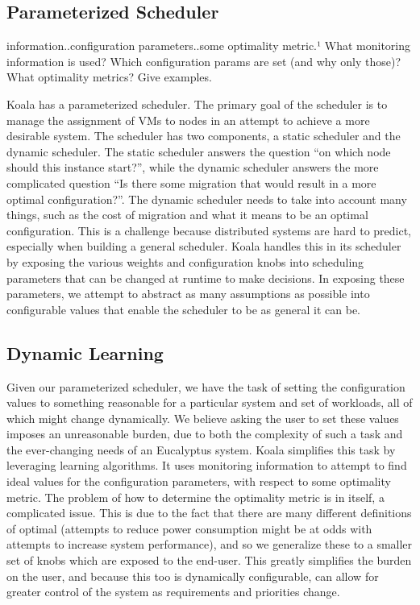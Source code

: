 \subsection{Parameterized Scheduler}
information..configuration parameters..some optimality metric.¹ What
monitoring information is used? Which configuration params are set (and why
only those)? What optimality metrics? Give examples.

Koala has a parameterized scheduler.  The primary goal of the scheduler is to
manage the assignment of VMs to nodes in an attempt to achieve a more desirable
system.  The scheduler has two components, a static scheduler and the dynamic
scheduler.  The static scheduler answers the question ``on which node should
this instance start?'', while the dynamic scheduler answers the more
complicated question ``Is there some migration that would result in a more
optimal configuration?''.  The dynamic scheduler needs to take into account
many things, such as the cost of migration and what it means to be an optimal
configuration.  This is a challenge because distributed systems are hard to
predict, especially when building a general scheduler.  Koala handles this in
its scheduler by exposing the various weights and configuration knobs into
scheduling parameters that can be changed at runtime to make decisions.  In
exposing these parameters, we attempt to abstract as many assumptions as
possible into configurable values that enable the scheduler to be as general it
can be.

\subsection{Dynamic Learning}
Given our parameterized scheduler, we have the task of setting the
configuration values to something reasonable for a particular system and set of
workloads, all of which might change dynamically.  We believe asking the user
to set these values imposes an unreasonable burden, due to both the complexity
of such a task and the ever-changing needs of an Eucalyptus system.  Koala
simplifies this task by leveraging learning algorithms.  It uses monitoring
information to attempt to find ideal values for the configuration parameters,
with respect to some optimality metric.  The problem of how to determine the
optimality metric is in itself, a complicated issue.  This is due to the fact
that there are many different definitions of optimal (attempts to reduce power
consumption might be at odds with attempts to increase system performance), and
so we generalize these to a smaller set of knobs which are exposed to the
end-user.  This greatly simplifies the burden on the user, and because this too
is dynamically configurable, can allow for greater control of the system as
requirements and priorities change.

